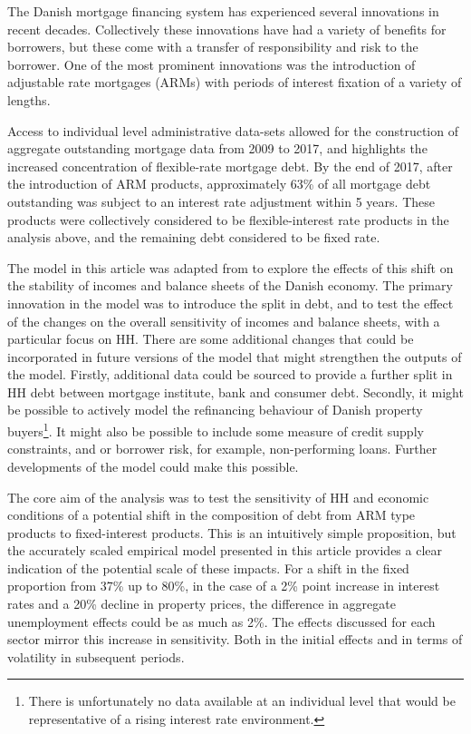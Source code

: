 \documentclass[
]{book}
\begin{document}
The Danish mortgage financing system has experienced several innovations in recent decades. Collectively these innovations have had a variety of benefits for borrowers, but these come with a transfer of responsibility and risk to the borrower. One of the most prominent innovations was the introduction of adjustable rate mortgages (ARMs) with periods of interest fixation of a variety of lengths.

Access to individual level administrative data-sets allowed for the construction of aggregate outstanding mortgage data from 2009 to 2017, and highlights the increased concentration of flexible-rate mortgage debt. By the end of 2017, after the introduction of ARM products, approximately 63\% of all mortgage debt outstanding was subject to an interest rate adjustment within 5 years. These products were collectively considered to be flexible-interest rate products in the analysis above, and the remaining debt considered to be fixed rate.

The model in this article was adapted from \citet{byrialsenraza2019empirical} to explore the effects of this shift on the stability of incomes and balance sheets of the Danish economy. The primary innovation in the model was to introduce the split in debt, and to test the effect of the changes on the overall sensitivity of incomes and balance sheets, with a particular focus on HH. There are some additional changes that could be incorporated in future versions of the model that might strengthen the outputs of the model. Firstly, additional data could be sourced to provide a further split in HH debt between mortgage institute, bank and consumer debt. Secondly, it might be possible to actively model the refinancing behaviour of Danish property buyers\footnote{There is unfortunately no data available at an individual level that would be representative of a rising interest rate environment.}. It might also be possible to include some measure of credit supply constraints, and or borrower risk, for example, non-performing loans. Further developments of the model could make this possible.

The core aim of the analysis was to test the sensitivity of HH and economic conditions of a potential shift in the composition of debt from ARM type products to fixed-interest products. This is an intuitively simple proposition, but the accurately scaled empirical model presented in this article provides a clear indication of the potential scale of these impacts. For a shift in the fixed proportion from 37\% up to 80\%, in the case of a 2\% point increase in interest rates and a 20\% decline in property prices, the difference in aggregate unemployment effects could be as much as 2\%. The effects discussed for each sector mirror this increase in sensitivity. Both in the initial effects and in terms of volatility in subsequent periods.
\end{document}
